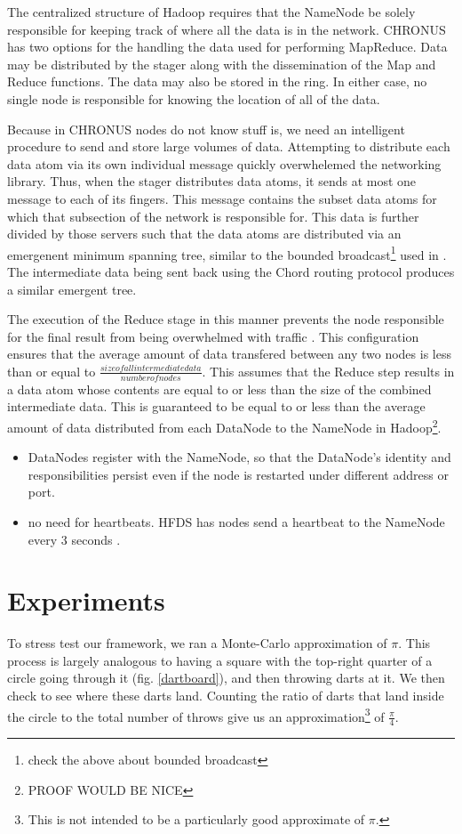 \documentclass[conference, compsocconf, letterpaper]{IEEEtran}
\begin{document}
The centralized structure of Hadoop requires that the NameNode be solely responsible for keeping track of where all the data is in the network\cite{Hadoop}.  CHRONUS has two options for the handling the data used for performing MapReduce.  Data may be distributed by the stager along with the dissemination of the Map and Reduce functions.  The data may also be stored in the ring\cite{CFS}.  In either case, no single node is responsible for knowing the location of all of the data.  

Because in CHRONUS nodes do not know stuff is, we need an intelligent procedure to send and store large volumes of data.  Attempting to distribute each data atom via its own individual message quickly overwhelemed the networking library. Thus, when the stager distributes data atoms, it sends at most one message to each of its fingers.  This message contains the subset data atoms for which that subsection of the network is responsible for.  This data is further divided by those servers such that the data atoms are distributed via an emergenent minimum spanning tree, similar to the bounded broadcast\footnote{check the above about bounded broadcast} used in \cite{leemap}.  The intermediate data being sent back using the Chord routing protocol produces a similar emergent tree. 

The execution of the Reduce stage in this manner prevents the node responsible for the final result from being overwhelmed with traffic \cite{hadoop-bottle}.  This configuration ensures that the average amount of data transfered between any two nodes is less than or equal to $\frac{size of all intermediate data}{number of nodes}$.  This assumes that the Reduce step results in a data atom whose contents are equal to or less than the size of the combined intermediate data.  This is guaranteed to be equal to or less than the average amount of data distributed from each DataNode to the NameNode in Hadoop\footnote{PROOF WOULD BE NICE}.

\begin{itemize}
    \item DataNodes register with the NameNode, so that the DataNode's identity and responsibilities persist even if the node is restarted under different address or port.
    \item no need for heartbeats.  HFDS has nodes send a heartbeat to the NameNode every 3 seconds \cite{shvachko2010hadoop}.  
\end{itemize}


\section{Experiments}
To stress test our framework, we ran a Monte-Carlo approximation of $\pi$. This process is largely analogous to having a square with the top-right quarter of a circle going through it (fig. \ref{dartboard}), and then throwing darts at it.  We then check to see where these darts land.  Counting the ratio of darts that land inside the circle to the total number of throws give us an approximation\footnote{This is not intended to be a particularly good approximate of $\pi$.} of $\frac{\pi}{4}$.
\end{document}
